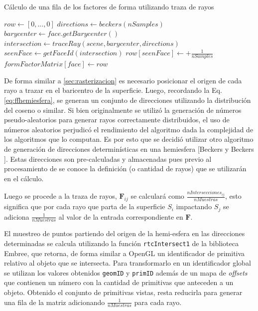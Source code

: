 \begin{algorithm}
	\caption{Cálculo de una fila de los factores de forma utilizando traza de rayos}
	\label{alg:processHemicube}
	\begin{algorithmic}
			\State $row \gets [0,...,0]$
			\State $directions \gets beckers(nSamples)$
			\State $barycenter \gets face.getBarycenter()$
			\State $intersection \gets traceRay(scene, barycenter, directions)$
			\State $seenFace \gets getFaceId(intersection)$
			\State $row[seenFace] \gets + \frac{1}{nSamples}$
			\EndIf
			\EndLoop
			\State $formFactorMatrix[face] \gets  row$
		\EndFunction
	\end{algorithmic}
\end{algorithm}

De forma similar a \ref{sec:rasterizacion} es necesario posicionar el origen de cada rayo a trazar en el baricentro de la superficie. Luego, recordando la Eq. \eqref{eq:ffhemiesfera}, se generan un conjunto de direcciones utilizando la distribución del coseno o similar. Si bien originalmente se utilizó la generación de números pseudo-aleatorios para generar rayos correctamente distribuidos, el uso de números aleatorios perjudicó el rendimiento del algoritmo dada la complejidad de los algoritmos que lo computan. Es por esto que se decidió utilizar otro algoritmo de generación de direcciones determinísticas en una hemiesfera [Beckers y Beckers \cite{Beckers}]. Estas direcciones son pre-calculadas y almacenadas pues previo al procesamiento de se conoce la definición (o cantidad de rayos) que se utilizarán en el cálculo.

Luego se procede a la traza de rayos, $\mathbf{F}_{ij}$ se calculará como $\frac{nIntersecciones_{ij}}{nMuestras}$, esto significa que por cada rayo que parta de la superficie $S_{i}$ impactando $S_{j}$ se adiciona $\frac{1}{nMuestras}$ al valor de la entrada correspondiente en $\mathbf{F}$.

El muestreo de puntos partiendo del origen de la hemi-esfera en las direcciones determinadas se calcula utilizando la función \verb|rtcIntersect1| de la biblioteca Embree, que retorna, de forma similar a OpenGL un identificador de primitiva relativo al objeto que se intersecta. Para transformarlo en un identificador global se utilizan los valores obtenidos \verb|geomID| y \verb|primID| además de un mapa de \textit{offsets} que contienen un número con la cantidad de primitivas que anteceden a un objeto. Obtenido el conjunto de primitivas vistas, resta reducirla para generar una fila de la matriz adicionando $\frac{1}{nMuestras}$ para cada rayo.

